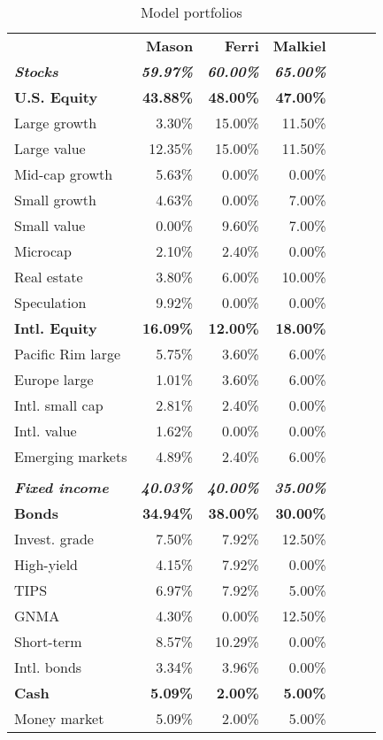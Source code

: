 \begin{table}[ht]
\caption{Model portfolios}
\label{tab:portfolios}
\centering
\begin{tabular}{l r r r r r r}
\\\hline
\\\hline
& \textbf{Mason} & \textbf{Ferri} & \textbf{Malkiel}\\
\hline
\textbf{\emph{Stocks}} & \textbf{\emph{59.97\%}} & \textbf{\emph{60.00\%}} & \textbf{\emph{65.00\%}}\\
\textbf{U.S. Equity} & \textbf{43.88\%} & \textbf{48.00\%} & \textbf{47.00\%}\\
Large growth & 3.30\% & 15.00\% & 11.50\%\\
Large value & 12.35\% & 15.00\% & 11.50\%\\
Mid-cap growth & 5.63\% & 0.00\% & 0.00\%\\
Small growth & 4.63\% & 0.00\% & 7.00\%\\
Small value & 0.00\% & 9.60\% & 7.00\%\\
Microcap & 2.10\% & 2.40\% & 0.00\%\\
Real estate & 3.80\% & 6.00\% & 10.00\%\\
Speculation & 9.92\% & 0.00\% & 0.00\%\\
\textbf{Intl. Equity} & \textbf{16.09\%} & \textbf{12.00\%} & \textbf{18.00\%}\\
Pacific Rim large & 5.75\% & 3.60\% & 6.00\%\\
Europe large & 1.01\% & 3.60\% & 6.00\%\\
Intl. small cap & 2.81\% & 2.40\% & 0.00\%\\
Intl. value & 1.62\% & 0.00\% & 0.00\%\\
Emerging markets & 4.89\% & 2.40\% & 6.00\%\\
\\
\textbf{\emph{Fixed income}} & \textbf{\emph{40.03\%}} & \textbf{\emph{40.00\%}} & \textbf{\emph{35.00\%}}\\
\textbf{Bonds} & \textbf{34.94\%} & \textbf{38.00\%} & \textbf{30.00\%}\\
Invest. grade & 7.50\% & 7.92\% & 12.50\%\\
High-yield & 4.15\% & 7.92\% & 0.00\%\\
TIPS & 6.97\% & 7.92\% & 5.00\%\\
GNMA & 4.30\% & 0.00\% & 12.50\%\\
Short-term & 8.57\% & 10.29\% & 0.00\%\\
Intl. bonds & 3.34\% & 3.96\% & 0.00\%\\
\textbf{Cash} & \textbf{5.09\%} & \textbf{2.00\%} & \textbf{5.00\%}\\
Money market & 5.09\% & 2.00\% & 5.00\%\\
\hline
\end{tabular}
\end{table}

